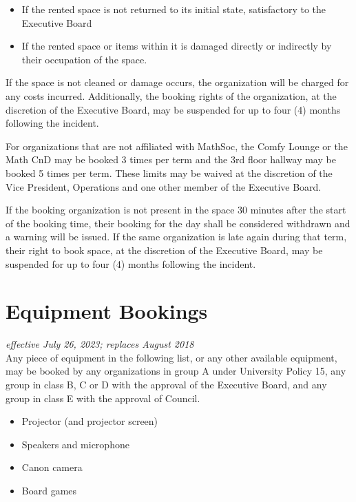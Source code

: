 \begin{itemize}
	\item If the rented space is not returned to its initial state, satisfactory to the Executive Board
	\item If the rented space or items within it is damaged directly or indirectly by their occupation
	      of the space.
\end{itemize}

If the space is not cleaned or damage occurs, the organization will be charged for any costs
incurred.
Additionally, the booking rights of the organization, at the discretion of the Executive Board,
may be suspended for up to four (4) months following the incident. 

For organizations that are not affiliated with MathSoc, the Comfy Lounge or the Math CnD may be 
booked 3 times per term and the 3rd floor hallway may be booked 5 times per term. These limits may 
be waived at the discretion of the Vice President, Operations and one other member of the Executive Board. 

If the booking organization is not present in the space 30 minutes after the start of the booking time, 
their booking for the day shall be considered withdrawn and a warning will be issued. If the same 
organization is late again during that term, their right to book space, at the discretion of the Executive 
Board, may be suspended for up to four (4) months following the incident.

\section{Equipment Bookings}
\emph{effective July 26, 2023; replaces August 2018}\\

Any piece of equipment in the following list, or any other available equipment,
may be booked by any organizations in group A under University Policy 15, any
group in class B, C or D with the approval of the Executive Board, and any
group in class E with the approval of Council.

\begin{itemize}
	\item Projector (and projector screen)
	\item Speakers and microphone
	\item Canon camera
	\item Board games
\end{itemize}

